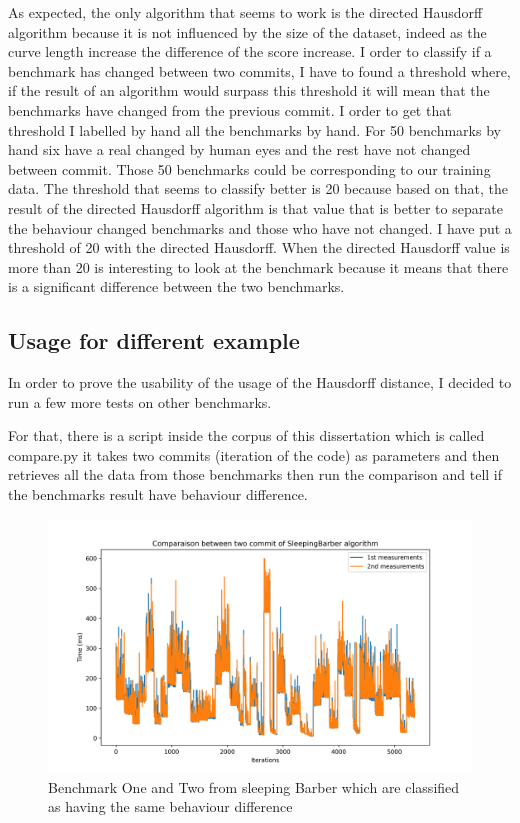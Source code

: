 \documentclass{article}
\begin{document}
As expected, the only algorithm that seems to work is the directed Hausdorff algorithm because it is not influenced by the size of the dataset, indeed as the curve length increase the difference of the score increase. 
I order to classify if a benchmark has changed between two commits, I have to found a threshold where, if the result of an algorithm would surpass this threshold it will mean that the benchmarks have changed from the previous commit. I order to get that threshold I labelled by hand all the benchmarks by hand. For 50 benchmarks by hand six have a real changed by human eyes and the rest have not changed between commit. Those 50 benchmarks could be corresponding to our training data. The threshold that seems to classify better is 20 because based on that, the result of the directed Hausdorff algorithm is that value that is better to separate the behaviour changed benchmarks and those who have not changed.
I have put a threshold of 20 with the directed Hausdorff. When the directed Hausdorff value is more than 20 is interesting to look at the benchmark because it means that there is a significant difference between the two benchmarks.


\subsection{Usage for different example}


In order to prove the usability of the usage of the Hausdorff distance, I decided to run a few more tests on other benchmarks.

For that, there is a script inside the corpus of this dissertation which is called compare.py it takes two commits (iteration of the code) as parameters and then retrieves all the data from those benchmarks then run the comparison and tell if the benchmarks result have behaviour difference. \\

\begin{figure}[]
    \centering
    \includegraphics[width=1\textwidth]{images/plot_SleepingBarber_4.069999999999936.png}
    \caption{Benchmark One and Two from sleeping Barber which are classified as having the same behaviour difference}
    \label{fig:bench_1_2_1}
\end{figure}
\end{document}
